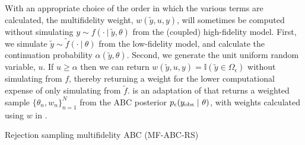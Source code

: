 \documentclass[review,demo]{siamonline190516}
\begin{document}
With an appropriate choice of the order in which the various terms are calculated, the multifidelity weight, $w(\tilde y, u, y)$, will sometimes be computed without simulating $y \sim f(\cdot~|~\tilde y, \theta)$ from the (coupled) high-fidelity model.
First, we simulate $\tilde y \sim \tilde f(\cdot~|~\theta)$ from the low-fidelity model, and calculate the continuation probability $\alpha(\tilde y, \theta)$.
Second, we generate the unit uniform random variable, $u$.
If $u \geq \alpha$ then we can return $w(\tilde y, u, y) = \mathbb I(\tilde y \in \Omega_{\epsilon})$ without simulating from $f$, thereby returning a weight for the lower computational expense of only simulating from $\tilde f$.
 is an adaptation of  that returns a weighted sample $\{ \theta_n, w_n \}_{n=1}^N$ from the ABC posterior $p_\epsilon(y_{\mathrm{obs}} ~|~ \theta)$, with weights calculated using $w$ in .

\begin{algorithm}
\caption{Rejection sampling multifidelity ABC (MF-ABC-RS)}
\label{MFABC:Rejection}
\begin{algorithmic}[1]
\REPEAT{}
 \ENDIF{}
\end{algorithmic}
\end{algorithm}
\end{document}

